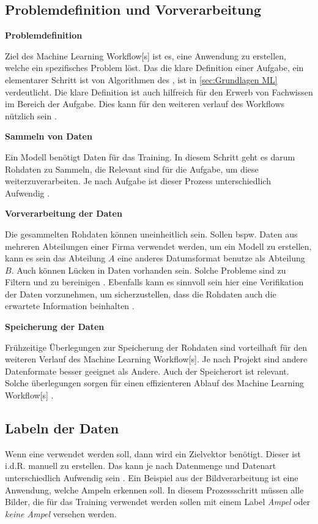 \subsection{Problemdefinition und Vorverarbeitung}

\textbf{Problemdefinition}\par
Ziel des \gls{Machine Learning Workflow}[s] ist es, eine Anwendung zu erstellen, welche ein spezifisches Problem löst. Das die klare Definition einer Aufgabe, ein elementarer Schritt ist von Algorithmen des , ist in \ref{sec:Grundlagen ML} verdeutlicht. Die klare Definition ist auch hilfreich für den Erwerb von Fachwissen im Bereich der Aufgabe. Dies kann für den weiteren verlauf des Workflows nützlich sein \cite{Biswas.2022, Zheng.2018, Nielsen.2020}. \dubpar

\textbf{Sammeln von Daten} \label{sec:Worflow DatSam}\par
Ein Modell benötigt Daten für das Training. In diesem Schritt geht es darum Rohdaten zu Sammeln, die Relevant sind für die Aufgabe, um diese weiterzuverarbeiten. Je nach Aufgabe ist dieser Prozess unterschiedlich Aufwendig \cite{Biswas.2022, Elshawi.2019}. \dubpar

\textbf{Vorverarbeitung der Daten}\par
Die gesammelten Rohdaten können uneinheitlich sein. Sollen bspw. Daten aus mehreren Abteilungen einer Firma verwendet werden, um ein Modell zu erstellen, kann es sein das Abteilung \(A\) eine anderes Datumsformat benutze als Abteilung \(B\). Auch können Lücken in Daten vorhanden sein. Solche Probleme sind zu Filtern und zu bereinigen \cite{Biswas.2022, Elshawi.2019}. Ebenfalls kann es sinnvoll sein hier eine Verifikation der Daten vorzunehmen, um sicherzustellen, dass die Rohdaten auch die erwartete Information beinhalten \cite{Shearer.2000}. \dubpar

\textbf{Speicherung der Daten}\par
Frühzeitige Überlegungen zur Speicherung der Rohdaten sind vorteilhaft für den weiteren Verlauf des \gls{Machine Learning Workflow}[s]. Je nach Projekt sind andere Datenformate besser geeignet als Andere. Auch der Speicherort ist relevant. Solche überlegungen sorgen für einen effizienteren Ablauf des \gls{Machine Learning Workflow}[s] \cite{Biswas.2022}. 

\subsection{Labeln der Daten}
Wenn eine  verwendet werden soll, dann wird ein \gls{Zielvektor} benötigt. Dieser ist i.d.R. manuell zu erstellen. Das kann je nach Datenmenge und Datenart unterschiedlich Aufwendig sein \cite{Biswas.2022}. Ein Beispiel aus der Bildverarbeitung ist eine Anwendung, welche Ampeln erkennen soll. In diesem Prozessschritt müssen alle Bilder, die für das Training verwendet werden sollen mit einem \gls{Label} \textit{Ampel} oder \textit{keine Ampel} versehen werden. 

